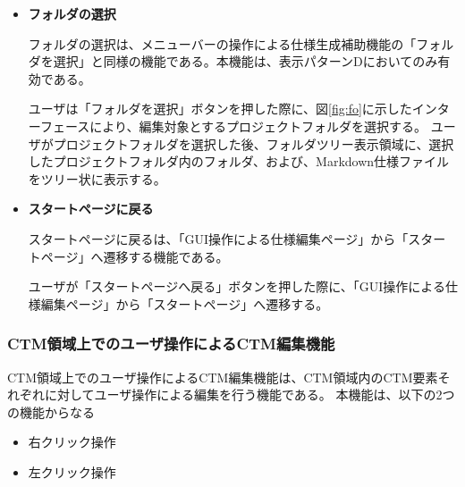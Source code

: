 \begin{itemize}
削除は、CTMの特定の要素を削除する機能である。
本機能により、ユーザは、不要なCTM要素をCTM領域から削除し、そのCTM要素に対応するMarkdown仕様、および、 VDM++仕様内の記述を削除できる。
本機能は、表示パターンB、および、表示パターンCにおいて有効である。

ユーザは、CTM領域上のCTM要素を左クリックし、削除対象とするCTM要素を決定する。削除対象とするCTM要素を決定後、ユーザが「削除」ボタンをクリックすることで、CTM領域上、Markdown仕様上、および、\VDM 仕様上から対応する要素、および、定義部分の削除を行う。
イベント要素、画面要素、遷移先のないイベント要素、および、タイムアウト要素の削除を行う際は、その要素のみを削除する。分岐イベント要素に関しては、分岐条件ごとに削除が可能である。
また、ボタン要素の削除を行う際は、そのボタン要素に関連するイベント要素も同時に削除する。


\item \textbf{フォルダの選択}\label{sec:SelectFolderButton}

フォルダの選択は、メニューバーの操作による仕様生成補助機能の「フォルダを選択」と同様の機能である。本機能は、表示パターンDにおいてのみ有効である。

ユーザは「フォルダを選択」ボタンを押した際に、図\ref{fig:fo}に示したインターフェースにより、編集対象とするプロジェクトフォルダを選択する。
ユーザがプロジェクトフォルダを選択した後、フォルダツリー表示領域に、選択したプロジェクトフォルダ内のフォルダ、および、Markdown仕様ファイルをツリー状に表示する。

\item \textbf{スタートページに戻る}

スタートページに戻るは、「GUI操作による\VDM 仕様編集ページ」から「スタートページ」へ遷移する機能である。

ユーザが「スタートページへ戻る」ボタンを押した際に、「GUI操作による\VDM 仕様編集ページ」から「スタートページ」へ遷移する。
\end{itemize}

\subsubsection{CTM領域上でのユーザ操作によるCTM編集機能}
CTM領域上でのユーザ操作によるCTM編集機能は、CTM領域内のCTM要素それぞれに対してユーザ操作による編集を行う機能である。
本機能は、以下の2つの機能からなる
\begin{itemize}
  \item 右クリック操作
  \item 左クリック操作
\end{itemize}

